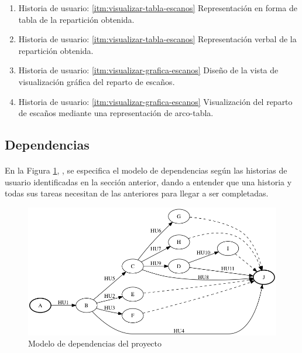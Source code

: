 \documentclass{article}
\begin{document}
\begin{enumerate}
        \item Historia de usuario: \ref{itm:visualizar-tabla-escanos} Representación en forma de tabla de la repartición obtenida.
        \item Historia de usuario: \ref{itm:visualizar-tabla-escanos} Representación verbal de la repartición obtenida.
        \item Historia de usuario: \ref{itm:visualizar-grafica-escanos} Diseño de la vista de visualización gráfica del reparto de escaños.
        \item Historia de usuario: \ref{itm:visualizar-grafica-escanos} Visualización del reparto de escaños mediante una representación de arco-tabla.
        \end{enumerate}
        
        
        
        
       	\subsection{Dependencias}
        
        	\paragraph{}
            En la Figura \ref{fig:dependencies}, , se especifica el modelo de dependencias según las historias de usuario identificadas en la sección anterior, dando a entender que una historia y todas sus tareas necesitan de las anteriores para llegar a ser completadas.
			
            \begin{figure}[!htpb]
			\includegraphics[width=\textwidth]{dependencies-graph}
			\caption{Modelo de dependencias del proyecto}\label{fig:dependencies}
			\end{figure}
            
\end{document}
